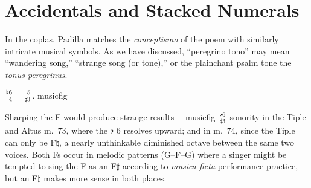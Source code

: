 \documentclass[12pt]{article}
\newcommand{\musicfig}[2]{\genfrac{}{}{0pt}{1}{#1}{#2}}
\newcommand{\blankfig}{\hphantom{\sharp}}
\begin{document}
\section{%
Accidentals and Stacked Numerals
}

In the coplas, Padilla matches the \emph{conceptismo} of the poem with similarly intricate musical symbols.
As we have discussed, ``peregrino tono'' may mean ``wandering song,'' ``strange song (or tone),'' or the plainchant psalm tone the \emph{tonus peregrinus}.

$\musicfig{\flat6}{\blankfig4}-\musicfig{\blankfig5}{\natural3}$. musicfig

Sharping the F would produce strange results---
musicfig $\musicfig{\flat6}{\sharp3}$ sonority 
in the Tiple and Altus m.~73, where the $\flat$ 6 resolves upward; and in m.~74, since the Tiple can only be F$\natural$, a nearly unthinkable diminished octave between the same two voices. 
Both Fs occur in melodic patterns (G--F--G) where a singer might be tempted to sing the F as an F$\sharp$ according to \emph{musica ficta} performance practice, but an F$\natural$ makes more sense in both places.
\end{document}
